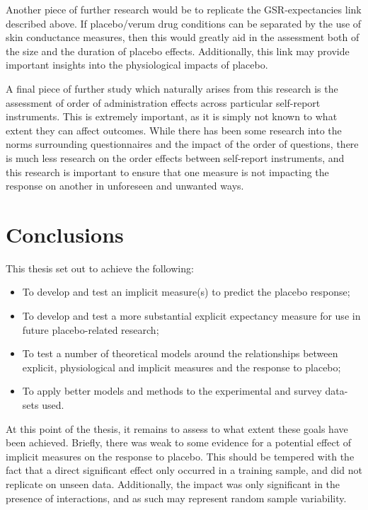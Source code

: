 Another piece of further research would be to replicate the
GSR-expectancies link described above. If placebo/verum drug
conditions can be separated by the use of skin conductance measures,
then this would greatly aid in the assessment both of the size and the
duration of placebo effects. Additionally, this link may provide
important insights into the physiological impacts of placebo.

A final piece of further study which naturally arises from this
research is the assessment of order of administration effects across
particular self-report instruments. This is extremely important, as it
is simply not known to what extent they can affect outcomes. While
there has been some research into the norms surrounding questionnaires
and the impact of the order of questions, there is much less research
on the order effects between self-report instruments, and this
research is important to ensure that one measure is not impacting the
response on another in unforeseen and unwanted ways.


\section{Conclusions}
\label{sec:concl-furth-rese}


This thesis set out to achieve the following:

\begin{itemize}
\item To develop and test an implicit measure(s) to predict the
placebo response;
\item To develop and test a more substantial explicit expectancy
measure for use in future placebo-related research;
\item To test a number of theoretical models around the relationships
between explicit, physiological and implicit measures and the response
to placebo;
\item To apply better models and methods to the experimental and
survey data-sets used.
\end{itemize}

At this point of the thesis, it remains to assess to what extent these
goals have been achieved. Briefly, there was weak to some evidence for
a potential effect of implicit measures on the response to placebo.
This should be tempered with the fact that a direct significant effect
only occurred in a training sample, and did not replicate on unseen
data. Additionally, the impact was only significant in the presence of
interactions, and as such may represent random sample variability.


